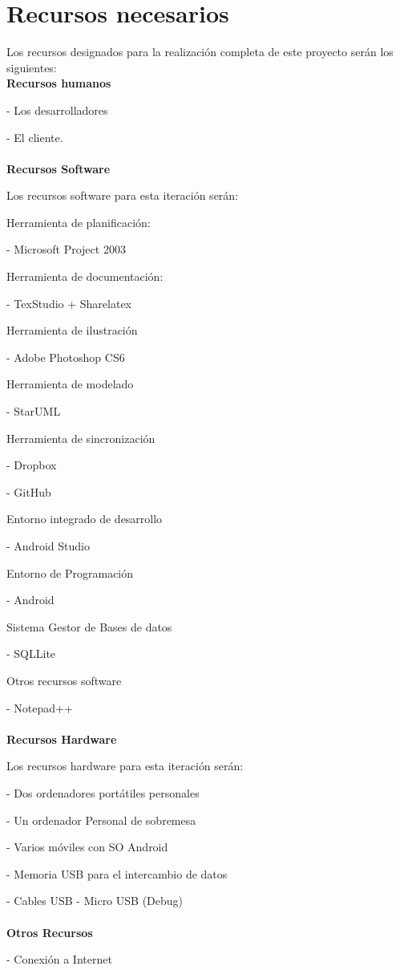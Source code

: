 \documentclass[../pfc.tex]{subfiles}
\begin{document}
	\section{Recursos necesarios}
	Los recursos designados para la realización completa de este proyecto serán los siguientes:\\
	
	\textbf{Recursos humanos}
	
	- Los desarrolladores
	
	- El cliente.\\\\
	
	\textbf{Recursos Software}
	
	Los recursos software para esta iteración serán:
	
	Herramienta de planificación:
	
	- Microsoft Project 2003
	
	Herramienta de documentación:
	
	- TexStudio + Sharelatex
	
	Herramienta de ilustración
	
	- Adobe Photoshop CS6
	
	Herramienta de modelado
	
	- StarUML
	
	Herramienta de sincronización
	
	- Dropbox
	
	- GitHub
	
	Entorno integrado de desarrollo
	
	- Android Studio
	
	Entorno de Programación
	
	- Android
	
	Sistema Gestor de Bases de datos
	
	- SQLLite
	
	Otros recursos software
	
	- Notepad++\\\\
	
	\textbf{Recursos Hardware}
	
	Los recursos hardware para esta iteración serán:
	
	- Dos ordenadores portátiles personales
	
	- Un ordenador Personal de sobremesa
	
	- Varios móviles con SO Android
	
	- Memoria USB para el intercambio de datos
	
	- Cables USB - Micro USB (Debug)\\\\
	
	\textbf{Otros Recursos}
	
	- Conexión a Internet \newpage

	
	
\end{document}
